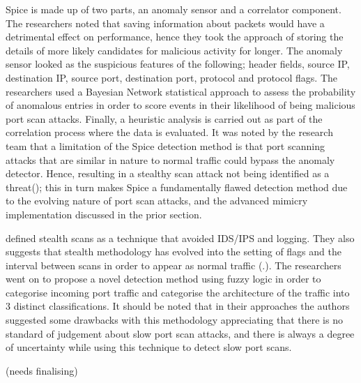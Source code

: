 Spice is made up of two parts, an anomaly sensor and a correlator component. The researchers noted that saving information about packets would have a detrimental effect on performance, hence they took the approach of storing the details of more likely candidates for malicious activity for longer. The anomaly sensor looked as the suspicious features of the following; header fields, source IP, destination IP, source port, destination port, protocol and protocol flags. The researchers used a Bayesian Network statistical approach to assess the probability of anomalous entries in order to score events in their likelihood of being malicious port scan attacks. Finally, a heuristic analysis is carried out as part of the correlation process where the data is evaluated. It was noted by the research team that a limitation of the Spice detection method is that port scanning attacks that are similar in nature to normal traffic could bypass the anomaly detector. Hence, resulting in a stealthy scan attack not being identified as a threat(\cite{staniford2002practical}); this in turn makes Spice a fundamentally flawed detection method due to the evolving nature of port scan attacks, and the advanced mimicry implementation discussed in the prior section.

\citeauthor{kim2008slow} defined stealth scans as a technique that avoided IDS/IPS and logging. They also suggests that stealth methodology has evolved into the setting of flags and the interval between scans in order to appear as normal traffic (.\cite{kim2008slow}). The researchers went on to propose a novel detection method using fuzzy logic in order to categorise incoming port traffic and categorise the architecture of the traffic into 3 distinct classifications. It should be noted that in their approaches the authors suggested some drawbacks with this methodology appreciating that there is no standard of judgement about slow port scan attacks, and there is always a degree of uncertainty while using this technique to detect slow port scans.

(needs finalising)